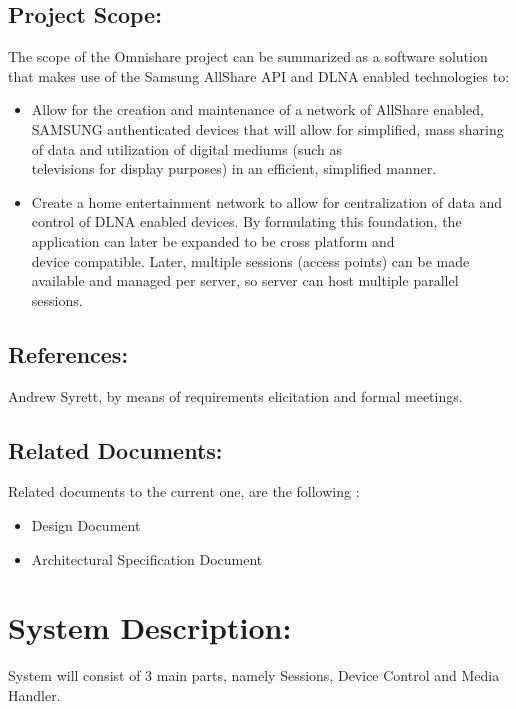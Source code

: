 \documentclass[12pt]{article}
\begin{document}
\subsection{Project Scope:}
The scope of the Omnishare project can be summarized as a software solution that makes use of the Samsung AllShare API and DLNA enabled technologies to:
\begin{itemize}
\item Allow for the creation and maintenance of a network of AllShare enabled, SAMSUNG authenticated devices  that will allow for simplified, mass sharing of data and utilization of digital mediums (such as
\\ televisions for display purposes) in an efficient, simplified manner.
\item  Create a home entertainment network to allow for centralization of data and control of DLNA enabled devices.
By formulating this foundation, the application can later be expanded to be cross platform and 
\\device compatible.  Later, multiple sessions (access points) can be made available and managed per server, so server can host multiple parallel sessions.
\end{itemize}

\subsection{References:}
Andrew Syrett, by means of requirements elicitation and formal meetings.

\subsection{Related Documents:}
Related documents to the current one, are the following :
\begin{itemize}
\item Design Document
\item Architectural Specification Document
\end{itemize}

\newpage
\section{System Description:}

System will consist of 3 main parts, namely Sessions, Device Control and Media Handler.
\end{document}
